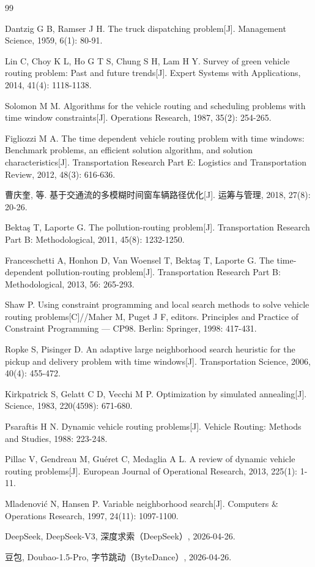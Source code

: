 \documentclass[withoutpreface,bwprint]{cumcmthesis} %
\begin{document}
\begin{thebibliography}{99}

Dantzig G B, Ramser J H. The truck dispatching problem[J]. Management Science, 1959, 6(1): 80-91.

Lin C, Choy K L, Ho G T S, Chung S H, Lam H Y. Survey of green vehicle routing problem: Past and future trends[J]. Expert Systems with Applications, 2014, 41(4): 1118-1138.

Solomon M M. Algorithms for the vehicle routing and scheduling problems with time window constraints[J]. Operations Research, 1987, 35(2): 254-265.

Figliozzi M A. The time dependent vehicle routing problem with time windows: Benchmark problems, an efficient solution algorithm, and solution characteristics[J]. Transportation Research Part E: Logistics and Transportation Review, 2012, 48(3): 616-636.

曹庆奎, 等. 基于交通流的多模糊时间窗车辆路径优化[J]. 运筹与管理, 2018, 27(8): 20-26.

Bektaş T, Laporte G. The pollution-routing problem[J]. Transportation Research Part B: Methodological, 2011, 45(8): 1232-1250.

Franceschetti A, Honhon D, Van Woensel T, Bektaş T, Laporte G. The time-dependent pollution-routing problem[J]. Transportation Research Part B: Methodological, 2013, 56: 265-293.

Shaw P. Using constraint programming and local search methods to solve vehicle routing problems[C]//Maher M, Puget J F, editors. Principles and Practice of Constraint Programming — CP98. Berlin: Springer, 1998: 417-431.

Ropke S, Pisinger D. An adaptive large neighborhood search heuristic for the pickup and delivery problem with time windows[J]. Transportation Science, 2006, 40(4): 455-472.

Kirkpatrick S, Gelatt C D, Vecchi M P. Optimization by simulated annealing[J]. Science, 1983, 220(4598): 671-680.

Psaraftis H N. Dynamic vehicle routing problems[J]. Vehicle Routing: Methods and Studies, 1988: 223-248.

Pillac V, Gendreau M, Guéret C, Medaglia A L. A review of dynamic vehicle routing problems[J]. European Journal of Operational Research, 2013, 225(1): 1-11.


Mladenović N, Hansen P. Variable neighborhood search[J]. Computers \& Operations Research, 1997, 24(11): 1097-1100.

DeepSeek, DeepSeek-V3, 深度求索（DeepSeek）, 2026-04-26.

豆包, Doubao-1.5-Pro, 字节跳动（ByteDance）, 2026-04-26.

\end{thebibliography}
\end{document}

